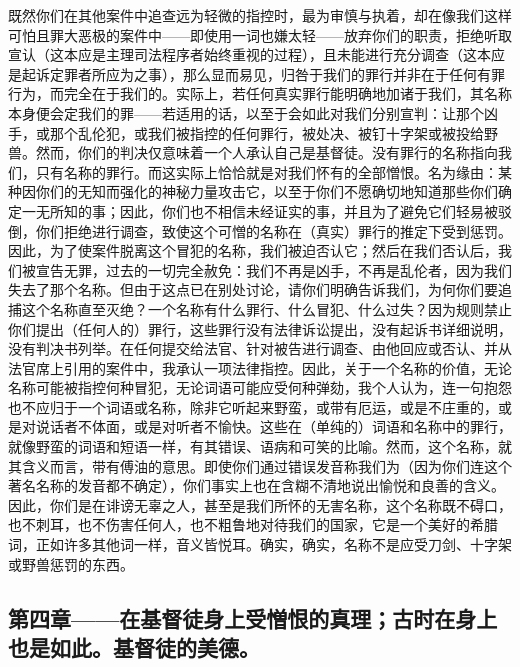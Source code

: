 既然你们在其他案件中追查远为轻微的指控时，最为审慎与执着，却在像我们这样可怕且罪大恶极的案件中——即使用一词也嫌太轻——放弃你们的职责，拒绝听取宣认（这本应是主理司法程序者始终重视的过程），且未能进行充分调查（这本应是起诉定罪者所应为之事），那么显而易见，归咎于我们的罪行并非在于任何有罪行为，而完全在于我们的。实际上，若任何真实罪行能明确地加诸于我们，其名称本身便会定我们的罪——若适用的话，以至于会如此对我们分别宣判：让那个凶手，或那个乱伦犯，或我们被指控的任何罪行，被处决、被钉十字架或被投给野兽。然而，你们的判决仅意味着一个人承认自己是基督徒。没有罪行的名称指向我们，只有名称的罪行。而这实际上恰恰就是对我们怀有的全部憎恨。名为缘由：某种因你们的无知而强化的神秘力量攻击它，以至于你们不愿确切地知道那些你们确定一无所知的事；因此，你们也不相信未经证实的事，并且为了避免它们轻易被驳倒，你们拒绝进行调查，致使这个可憎的名称在（真实）罪行的推定下受到惩罚。因此，为了使案件脱离这个冒犯的名称，我们被迫否认它；然后在我们否认后，我们被宣告无罪，过去的一切完全赦免：我们不再是凶手，不再是乱伦者，因为我们失去了那个名称。但由于这点已在别处讨论，请你们明确告诉我们，为何你们要追捕这个名称直至灭绝？一个名称有什么罪行、什么冒犯、什么过失？因为规则禁止你们提出（任何人的）罪行，这些罪行没有法律诉讼提出，没有起诉书详细说明，没有判决书列举。在任何提交给法官、针对被告进行调查、由他回应或否认、并从法官席上引用的案件中，我承认一项法律指控。因此，关于一个名称的价值，无论名称可能被指控何种冒犯，无论词语可能应受何种弹劾，我个人认为，连一句抱怨也不应归于一个词语或名称，除非它听起来野蛮，或带有厄运，或是不庄重的，或是对说话者不体面，或是对听者不愉快。这些在（单纯的）词语和名称中的罪行，就像野蛮的词语和短语一样，有其错误、语病和可笑的比喻。然而，这个名称，就其含义而言，带有傅油的意思。即使你们通过错误发音称我们为（因为你们连这个著名名称的发音都不确定），你们事实上也在含糊不清地说出愉悦和良善的含义。因此，你们是在诽谤无辜之人，甚至是我们所怀的无害名称，这个名称既不碍口，也不刺耳，也不伤害任何人，也不粗鲁地对待我们的国家，它是一个美好的希腊词，正如许多其他词一样，音义皆悦耳。确实，确实，名称不是应受刀剑、十字架或野兽惩罚的东西。\par


\subsection{第四章——在基督徒身上受憎恨的真理；古时在身上也是如此。基督徒的美德。}

